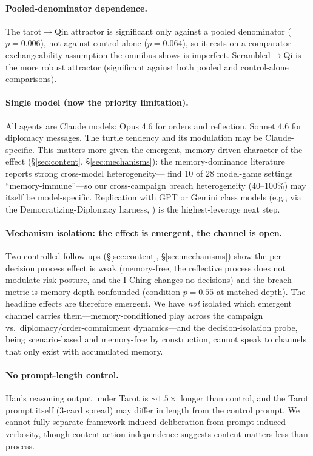 \documentclass[11pt]{article}
\begin{document}
\paragraph{Pooled-denominator dependence.} The tarot$\to$Qin attractor is significant only against a pooled denominator ($p = 0.006$), not against control alone ($p = 0.064$), so it rests on a comparator-exchangeability assumption the omnibus shows is imperfect. Scrambled$\to$Qi is the more robust attractor (significant against both pooled and control-alone comparisons).

\paragraph{Single model (now the priority limitation).} All agents are Claude models: Opus 4.6 for orders and reflection, Sonnet 4.6 for diplomacy messages. The turtle tendency and its modulation may be Claude-specific. This matters more given the emergent, memory-driven character of the effect (\S\ref{sec:content}, \S\ref{sec:mechanisms}): the memory-dominance literature reports strong cross-model heterogeneity---\citet{MemoryCurse2026} find 10 of 28 model-game settings ``memory-immune''---so our cross-campaign breach heterogeneity (40--100\%) may itself be model-specific. Replication with GPT or Gemini class models (e.g., via the Democratizing-Diplomacy harness, \citealt{DemocratizingDiplomacy2025}) is the highest-leverage next step.

\paragraph{Mechanism isolation: the effect is emergent, the channel is open.} Two controlled follow-ups (\S\ref{sec:content}, \S\ref{sec:mechanisms}) show the per-decision process effect is weak (memory-free, the reflective process does not modulate risk posture, and the I-Ching changes no decisions) and the breach metric is memory-depth-confounded (condition $p = 0.55$ at matched depth). The headline effects are therefore emergent. We have \emph{not} isolated which emergent channel carries them---memory-conditioned play across the campaign vs.\ diplomacy/order-commitment dynamics---and the decision-isolation probe, being scenario-based and memory-free by construction, cannot speak to channels that only exist with accumulated memory.

\paragraph{No prompt-length control.} Han's reasoning output under Tarot is ${\sim}1.5\times$ longer than control, and the Tarot prompt itself (3-card spread) may differ in length from the control prompt. We cannot fully separate framework-induced deliberation from prompt-induced verbosity, though content-action independence suggests content matters less than process.
\end{document}
